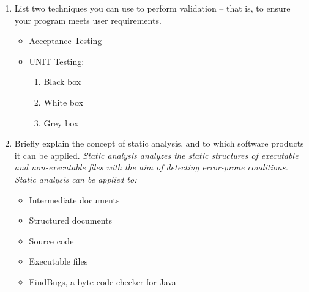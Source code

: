 \documentclass[11pt]{article}
\begin{document}
\begin{enumerate}
        \item List two techniques you can use to perform validation -- that is, to ensure your program meets user requirements. 
        \begin{itemize}
            \item Acceptance Testing
            \item UNIT Testing:
            \begin{enumerate}
                \item Black box
                \item White box
                \item Grey box
            \end{enumerate}
        \end{itemize}
        
        \item Briefly explain the concept of static analysis, and to which software products it can be applied.
        \newline 
       \textit{Static analysis analyzes the static structures of executable and non-executable files with the aim of detecting error-prone conditions. Static analysis can be applied to:}
        \begin{itemize}
            \item Intermediate documents
            \item Structured documents
            \item Source code
            \item Executable files
            \item FindBugs, a byte code checker for Java
        \end{itemize}
        

\end{enumerate}
\end{document}
